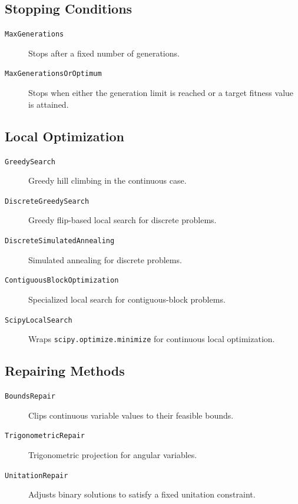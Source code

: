 \documentclass[a4paper,11pt]{article}
\begin{document}
\subsection{Stopping Conditions}

\begin{description}
  \item[\texttt{MaxGenerations}]
    Stops after a fixed number of generations.

  \item[\texttt{MaxGenerationsOrOptimum}]
    Stops when either the generation limit is reached or a target fitness
    value is attained.
\end{description}

\subsection{Local Optimization}

\begin{description}
  \item[\texttt{GreedySearch}]
    Greedy hill climbing in the continuous case.

  \item[\texttt{DiscreteGreedySearch}]
    Greedy flip-based local search for discrete problems.

  \item[\texttt{DiscreteSimulatedAnnealing}]
    Simulated annealing for discrete problems.

  \item[\texttt{ContiguousBlockOptimization}]
    Specialized local search for contiguous-block problems.

  \item[\texttt{ScipyLocalSearch}]
    Wraps \texttt{scipy.optimize.minimize} for continuous local optimization.
\end{description}

\subsection{Repairing Methods}

\begin{description}
  \item[\texttt{BoundsRepair}]
    Clips continuous variable values to their feasible bounds.

  \item[\texttt{TrigonometricRepair}]
    Trigonometric projection for angular variables.

  \item[\texttt{UnitationRepair}]
    Adjusts binary solutions to satisfy a fixed unitation constraint.
\end{description}
\end{document}
